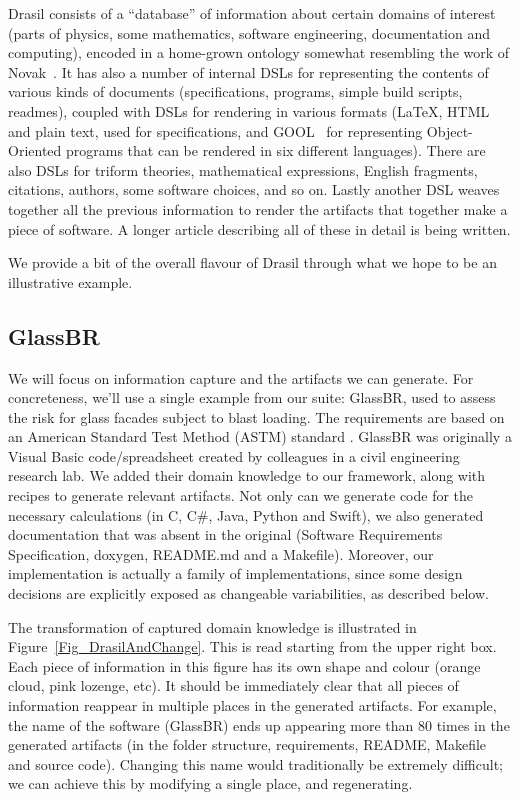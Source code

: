\documentclass[a4paper,UKenglish,cleveref,autoref,thm-restate]{oasics-v2021}
\newcommand{\CC}{C\nolinebreak\hspace{-.05em}\raisebox{.4ex}{\small\bf +}\nolinebreak\hspace{-.10em}\raisebox{.4ex}{\small\bf +}}
\begin{document}
Drasil consists of a ``database'' of information about certain domains of
interest (parts of physics, some mathematics, software engineering,
documentation and computing), encoded in a home-grown ontology somewhat
resembling the work of Novak~\cite{kook1991representation,novak1994generating}.
It has also a number of internal DSLs for representing the contents of
various kinds of documents (specifications, programs, simple build scripts,
readmes), coupled with DSLs for rendering in various formats (\LaTeX, HTML
and plain text, used for specifications, and GOOL~\cite{GOOLPEPM} for
representing Object-Oriented programs that can be rendered in six different
languages). There are also DSLs for triform theories, mathematical expressions,
English fragments, citations, authors, some software choices, and so on. Lastly
another DSL weaves together all the previous information to render the
artifacts that together make a piece of software. A longer article describing
all of these in detail is being written.

We provide a bit of the overall flavour of Drasil through what we hope to be
an illustrative example.

\subsection{GlassBR}
We will focus on information capture and the artifacts we can generate. For
concreteness, we'll use a single example from our suite: GlassBR, used to assess
the risk for glass facades subject to blast loading. The requirements are based
on an American Standard Test Method (ASTM) standard \cite{ASTM2009, ASTM2015,
BeasonEtAl1998}. GlassBR was originally a Visual Basic code/spreadsheet
created by colleagues in a civil engineering research lab.  We added their
domain knowledge to our framework, along with recipes to generate relevant
artifacts.  Not only can we generate code for the necessary calculations (in
\CC, C\#, Java, Python and Swift), we also generated documentation that was absent in the
original (Software Requirements Specification, doxygen, README.md and a
Makefile). Moreover, our implementation is actually a family of implementations,
since some design decisions are explicitly exposed as changeable variabilities,
as described below.

The transformation of captured domain knowledge is illustrated in
Figure~\ref{Fig_DrasilAndChange}. This is read starting from the upper right
box. Each piece of information in this figure has its own shape and colour
(orange cloud, pink lozenge, etc). It should be immediately clear that all
pieces of information reappear in multiple places in the generated artifacts.
For example, the name of the software (GlassBR) ends up appearing more than 80
times in the generated artifacts (in the folder structure, requirements, README,
Makefile and source code). Changing this name would traditionally be extremely
difficult; we can achieve this by modifying a single place, and regenerating.
\end{document}
